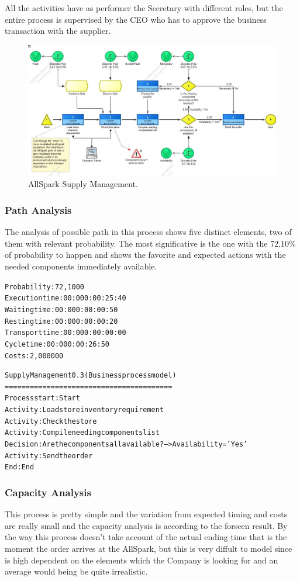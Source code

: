 All the activities have as performer the Secretary with different roles, but the entire process is supervised by the CEO who has to approve the business transaction with the supplier.

\begin{figure}[ht!]
\begin{centering}
\includegraphics[scale=0.50, angle=90]{assign2/adonis/imgs/supply_man.jpg}
\caption{AllSpark Supply Management.}
\label{2img:supply_man}
\end{centering}
\end{figure}


\subsubsection{Path Analysis}
The analysis of possible path in this process shows five distinct elements, two of them with relevant probability. The most significative is the one with the 72,10\% of probability to happen and shows the favorite and expected actions with the needed components immediately available.

\begin{alltt}
Probability:   72,1000%
Execution time:  00:000:00:25:40
Waiting time:  00:000:00:00:50
Resting time:  00:000:00:00:20
Transport time:  00:000:00:00:00
Cycle time:  00:000:00:26:50
Costs:  2,000000

Supply Management 0.3 (Business process model)
========================================
Process start: Start
Activity: Load store inventory requirement
Activity: Check the store
Activity: Compile needing components list
Decision: Are the components all available? --> Availability = 'Yes'
Activity: Send the order
End: End
\end{alltt}


\subsubsection{Capacity Analysis}
This process is pretty simple and the variation from expected timing and costs are really small and the capacity analysis is according to the forseen result. By the way this process doesn't take account of the actual ending time that is the moment the order arrives at the AllSpark, but this is very diffult to model since is high dependent on the elements which the Company is looking for and an average would being be quite irrealistic.

